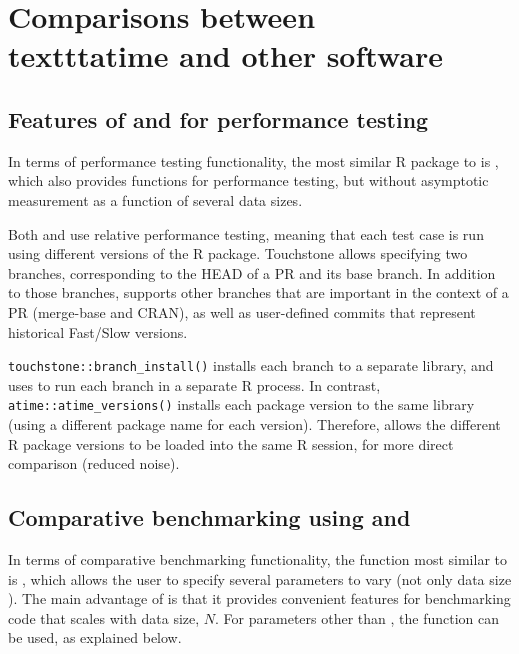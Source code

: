 \section{Comparisons between \\texttt{atime} and other software}

\subsection{Features of  and   for performance testing}

In terms of performance testing functionality, the most similar R package to  is , which also provides functions for performance testing, but without asymptotic measurement as a function of several data sizes. 


Both  and  use relative performance testing, meaning that each test case is run using different versions of the R package.
Touchstone allows specifying two branches, corresponding to the HEAD of a PR and its base branch.
In addition to those branches,  supports other branches that are important in the context of a PR (merge-base and CRAN), as well as user-defined commits that represent historical Fast/Slow versions.

\verb|touchstone::branch_install()| installs each branch to a separate library, and uses  to run each branch in a separate R process.
In contrast, \verb|atime::atime_versions()| installs each package version to the same library (using a different package name for each version).
Therefore,  allows the different R package versions to be loaded into the same R session, for more direct comparison (reduced noise).

\subsection{Comparative benchmarking using  and }


In terms of comparative benchmarking functionality, the function most similar to  is , which allows the user to specify several parameters to vary (not only data size ). 
The main advantage of  is that it provides convenient features for benchmarking code that scales with data size, $N$. 
For parameters other than , the  function can be used, as explained below.

